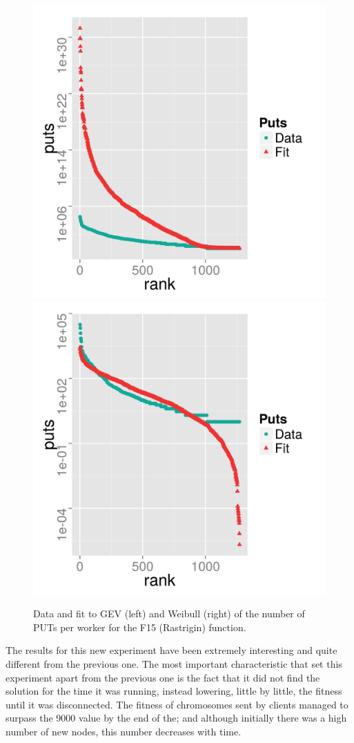 \documentclass{sig-alternate}
\begin{document}
\begin{figure}[!htb]
\centering
\includegraphics[width=0.49\linewidth]{gev-fit-ww-rastrigin-workers.png}
\includegraphics[width=0.49\linewidth]{weibull-fit-ww-rastrigin-workers.png}
\caption{Data and fit to GEV (left) and Weibull (right) of the number
  of PUTs per worker for the F15 (Rastrigin) function.}  
\label{fig:fit:rastrigin}
\end{figure}
%

The results for this new experiment have been extremely interesting
and quite different from the previous one. The most important
characteristic that set this experiment apart from the previous one is
the fact that it did not find the solution for the time it was
running, instead lowering, little by little, the fitness until it was
disconnected. The fitness of chromosomes sent by clients managed to
surpass the 9000 value by the end of the; and although initially there
was a high number of new nodes, this number decreases with time.
\end{document}
